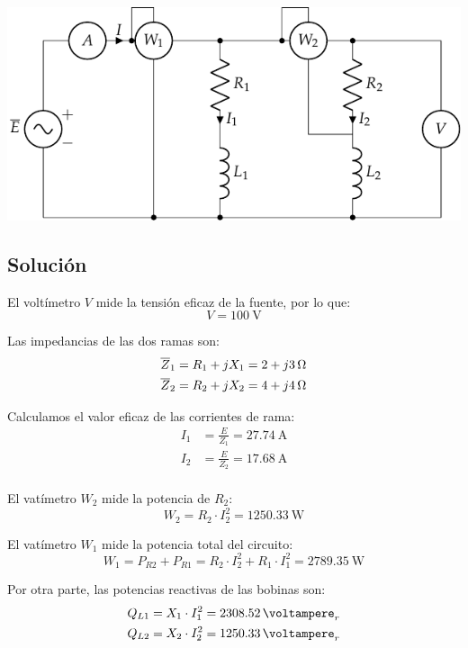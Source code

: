 \begin{center}
  \includegraphics{figuras/BT2_11.pdf}
\end{center}

\subsection*{Solución}

El voltímetro $V$ mide la tensión eficaz de la fuente, por lo que:
\begin{equation*}
  V=\qty{100}{\volt}
\end{equation*}

Las impedancias de las dos ramas son:
\begin{align*}
  \overline{Z}_1 &= R_1 + jX_1 = \qty[parse-numbers=false]{2 + j3}{\ohm}\\
  \overline{Z}_2 &= R_2 + jX_2 = \qty[parse-numbers=false]{4 + j4}{\ohm}
\end{align*}

Calculamos el valor eficaz de las corrientes de rama:
\begin{align*}
  I_1 &= \frac{E}{Z_1} = \qty{27.74}{\ampere}\\
  I_2 &= \frac{E}{Z_2} = \qty{17.68}{\ampere}\\
\end{align*}

El vatímetro $W_2$ mide la potencia de $R_2$:
\begin{equation*}
  W_2=R_2 \cdot I_2^2= \qty{1250.33}{\watt}
\end{equation*}

El vatímetro $W_1$ mide la potencia total del circuito:
\begin{equation*}
  W_1= P_{R2} + P_{R1} = R_2 \cdot I_2^2 + R_1 \cdot I_1^2 = \qty{2789.35}{\watt}
\end{equation*}

Por otra parte, las potencias reactivas de las bobinas son:
\begin{align*}
  Q_{L1} &= X_1 \cdot I_1^2 = \qty{2308.52}{\voltampere}_r\\
  Q_{L2} &= X_2 \cdot I_2^2 = \qty{1250.33}{\voltampere}_r
\end{align*}

